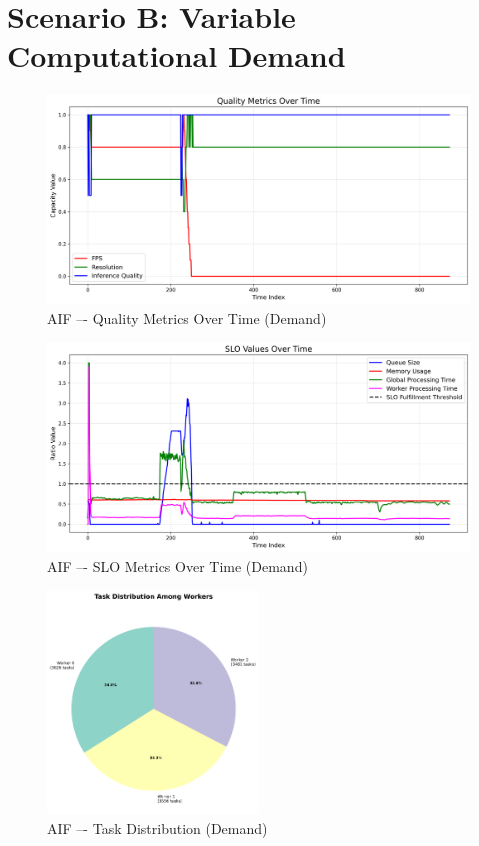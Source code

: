 \clearpage
\section{Scenario B: Variable Computational Demand}





\begin{figure}[h]
    \centering
    \includegraphics[width=\textwidth]{img/results/variable_computational_demand/active_inference_relative_control_quality_metrics.png}
    \caption{AIF –- Quality Metrics Over Time (Demand)}
\end{figure}
\begin{figure}[h]
    \centering
    \includegraphics[width=\textwidth]{img/results/variable_computational_demand/active_inference_relative_control_slo_values.png}
    \caption{AIF –- SLO Metrics Over Time (Demand)}
\end{figure}
\begin{figure}[h]
    \centering
    \includegraphics[width=0.5\textwidth]{img/results/variable_computational_demand/active_inference_relative_control_task_distribution_pie.png}
    \caption{AIF –- Task Distribution (Demand)}
\end{figure}
